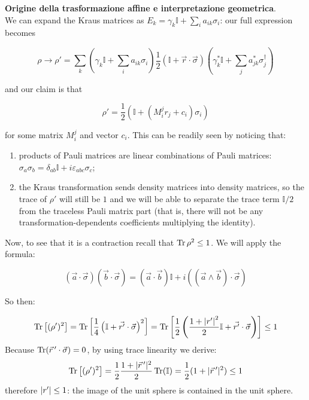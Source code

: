 \documentclass[../../InformazioneQuantistica.tex]{subfiles}
\begin{document}
\begin{appr} \textbf{Origine della trasformazione affine e interpretazione geometrica}.\\
We can expand the Kraus matrices as \(E_k = \gamma_k \mathbb I + \sum _{i} a_{ik} \sigma_i \): our full expression becomes

\begin{equation}
    \rho \rightarrow \rho' =
    \sum _{k}
    \left(\gamma_k \mathbb I + \sum _{i} a_{ik} \sigma_i\right)
    \frac{1}{2} \left(\mathbb I + \vec{r} \cdot \vec{\sigma}\right)
    \left(\gamma_k^* \mathbb I + \sum _{j} a_{jk}^* \sigma_j ^\dag\right)
\end{equation}

and our claim is that

\begin{equation}
    \rho' =
    \frac{1}{2} (\mathbb I + (M_i^j r_j + c_i) \sigma_i)
\end{equation}

for some matrix \(M_i^j\) and vector \(c_i\).
This can be readily seen by noticing that:

\begin{enumerate}
    \item products of Pauli matrices are linear combinations of Pauli matrices: \(\sigma_a \sigma_b = \delta_{ab} \mathbb I + i \varepsilon_{abc} \sigma_c\);
    \item the Kraus transformation sends density matrices into density matrices, so the trace of \(\rho'\) will still be \(1\) and we will be able to separate the trace term \(\mathbb I/2\) from the traceless Pauli matrix part (that is, there will not be any transformation-dependents coefficients multiplying the identity).
\end{enumerate}

Now, to see that it is a contraction recall that \(\operatorname{Tr} \rho^2 \leq 1\). We will apply the formula:

\begin{equation}
(\vec{a} \cdot \vec{\sigma}) (\vec{b} \cdot \vec{\sigma}) = (\vec{a} \cdot \vec{b}) \mathbb I  + i ((\vec{a} \wedge \vec{b}) \cdot \vec{\sigma})
\end{equation}

So then:

\begin{equation}
    \operatorname{Tr} \left[(\rho')^2\right] = \operatorname{Tr}\left[\frac{1}{4} \left(\mathbb I + \vec{r'} \cdot \vec{\sigma}\right)^2\right]
      = \operatorname{Tr}\left[\frac{1}{2} \left(\frac{1 + \left|r'\right|^2 }{2} \mathbb I + \vec{r'} \cdot \vec{\sigma}\right)\right] \leq 1
\end{equation}
Because $\operatorname{Tr}(\vec{r}\,'\cdot \vec{\sigma}) = 0$, by using trace linearity we derive:
\begin{align*}
    \operatorname{Tr}\left[(\rho')^2\right] = \frac{1}{2}\frac{1 + |\vec{r}\,'|^2}{2} \operatorname{Tr}(\mathbb{I}) = \frac{1}{2}(1+|\vec{r}\,'|^2) \leq 1
\end{align*}
therefore \(\left|r'\right| \leq 1\): the image of the unit sphere is contained in the unit sphere.
\end{appr}
\end{document}
